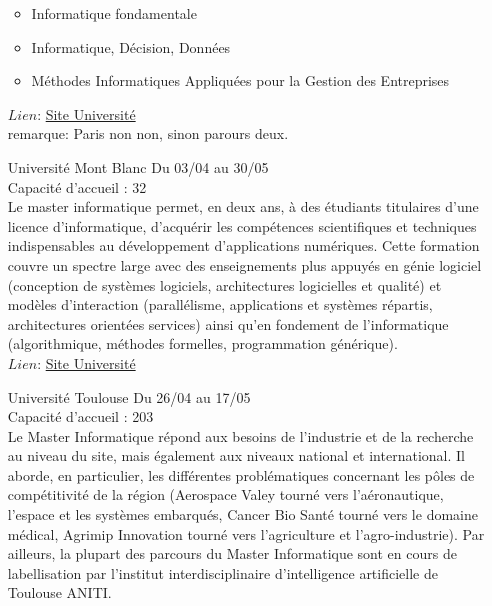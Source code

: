 \documentclass[a4paper,11pt]{article}
\begin{document}
\begin{enumerate}
                    \begin{itemize}
                        \item Informatique fondamentale
                        \item Informatique, Décision, Données
                        \item Méthodes Informatiques Appliquées pour la Gestion des Entreprises
                    \end{itemize}
                    $Lien$: \href{https://psl.eu/formation/master-informatique-0}{Site Université}
                    \\ remarque: Paris non non, sinon parours deux.
\\
        \item [\color{LightOrangeHaf}Université Mont Blanc] Du 03/04 au 30/05
                    \\Capacité d'accueil : 32
                    \\Le master informatique permet, en deux ans, à des étudiants titulaires d'une licence d'informatique, d’acquérir les compétences scientifiques et techniques indispensables au développement d’applications numériques.  Cette formation couvre un spectre large avec des enseignements plus appuyés en génie logiciel (conception de systèmes logiciels, architectures logicielles et qualité) et modèles d’interaction (parallélisme, applications et systèmes répartis, architectures orientées services) ainsi qu'en fondement de l’informatique (algorithmique, méthodes formelles, programmation générique).
                    \\$Lien$: \href{https://formations.univ-smb.fr/fr/catalogue/master-XB/sciences-technologies-sante-STS/master-informatique-KHQI8NZ0.html}{Site Université}
        \item [\color{LightOrangeHaf}Université Toulouse] Du 26/04 au 17/05
                    \\Capacité d'accueil : 203
                    \\Le Master Informatique répond aux besoins de l’industrie et de la recherche au niveau du site, mais également aux niveaux national et international. Il aborde, en particulier, les différentes problématiques concernant les pôles de compétitivité de la région (Aerospace Valey tourné vers l’aéronautique, l’espace et les systèmes embarqués, Cancer Bio Santé tourné vers le domaine médical, Agrimip Innovation tourné vers l’agriculture et l’agro-industrie). Par ailleurs, la plupart des parcours du Master Informatique sont en cours de labellisation par l’institut interdisciplinaire d’intelligence artificielle de Toulouse ANITI.

\end{enumerate}
\end{document}
